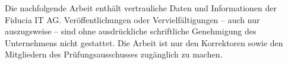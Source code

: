 
Die nachfolgende Arbeit enthält vertrauliche Daten und Informationen der Fiducia IT AG. Veröffentlichungen oder Vervielfältigungen -- auch nur auszugsweise -- sind ohne ausdrückliche schriftliche Genehmigung des Unternehmens nicht gestattet. Die Arbeit ist nur den Korrektoren sowie den Mitgliedern des Prüfungsausschusses zugänglich zu machen.
